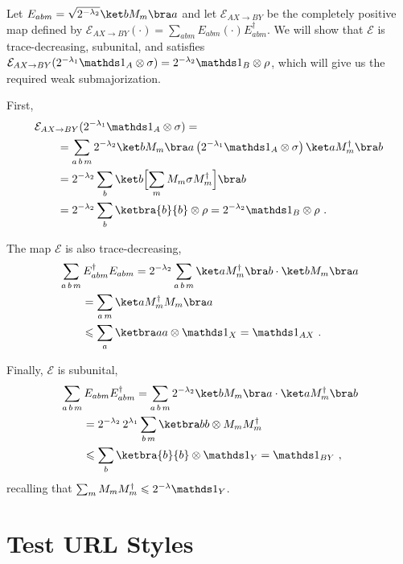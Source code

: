 \documentclass[11pt,a4paper]{article}
\theoremstyle{plain}
\newenvironment{myproof}[1][\proofname]{%
  \color{prooftextcolor} \footnotesize \proof[\itshape #1]\hspace*{1.2mm}%
}{\endproof}
\begin{document}
\begin{myproof}[Proof of Prop.~\ref{prop:LambdaMajorizationTMap}]
  Let $E_{abm} = \sqrt{2^{-\lambda_2}} \ket b M_m \bra a$ and let $\mathcal{E}_{AX\rightarrow BY}$ be the
  completely positive map defined by $\mathcal{E}_{AX\rightarrow BY}(\cdot) =
  \sum_{abm} E_{abm}\left(\cdot\right)E_{abm}^\dagger$. We will show that $\mathcal{E}$ is trace-decreasing,
  subunital, and satisfies $\mathcal{E}_{AX\rightarrow BY}(2^{-\lambda_1}\Ident_A\otimes\sigma) =
  2^{-\lambda_2}\Ident_B\otimes\rho$,
  which will give us the required weak submajorization.
  
  First,
  \begin{align*}
    &\mathcal{E}_{AX\rightarrow BY}(2^{-\lambda_1}\Ident_A\otimes\sigma) = \\
    &\qquad = \sum_{a\,b\,m} 2^{-\lambda_2} \ket b M_m \bra a \left(2^{-\lambda_1}\Ident_A\otimes\sigma\right)
    \ket a M_m^\dagger \bra b \\
    &\qquad = 2^{-\lambda_2} \sum_{b} \ket b \Bigl[\sum_m M_m \sigma M_m^\dagger \Bigr] \bra b \\
    &\qquad = 2^{-\lambda_2} \sum_b \ketbra{b}{b}\otimes \rho  = 2^{-\lambda_2}\Ident_B\otimes\rho\ .
  \end{align*}

  The map $\mathcal{E}$ is also trace-decreasing,
  \begin{align*}
    &\sum_{a\,b\,m} E_{abm}^\dagger E_{abm} = 2^{-\lambda_2} \sum_{a\,b\,m} \ket a M_m^\dagger \bra b\cdot
    \ket b M_m \bra a \\
    &\qquad = \sum_{a\,m} \ket a M_m^\dagger M_m \bra a \\
    &\qquad \leqslant \sum_a \ketbra aa \otimes \Ident_X
    = \Ident_{AX}\ .
  \end{align*}

  Finally, $\mathcal{E}$ is subunital,
  \begin{align*}
    &\sum_{a\,b\,m} E_{abm} E_{abm}^\dagger
    = \sum_{a\,b\,m} 2^{-\lambda_2} \ket b M_m \bra a \cdot \ket a M_m^\dagger \bra b \\
    &\qquad = 2^{-\lambda_2}\,2^{\lambda_1} \sum_{b\,m} \ketbra bb \otimes M_m M_m^\dagger \\
    &\qquad \leqslant \sum_b \ketbra{b}{b}\otimes \Ident_Y = \Ident_{BY}\ ,
  \end{align*}
  recalling that $\sum_m M_m M_m^\dagger \leqslant 2^{-\lambda}\Ident_Y$.
\end{myproof}


\section*{Test URL Styles}
\end{document}
